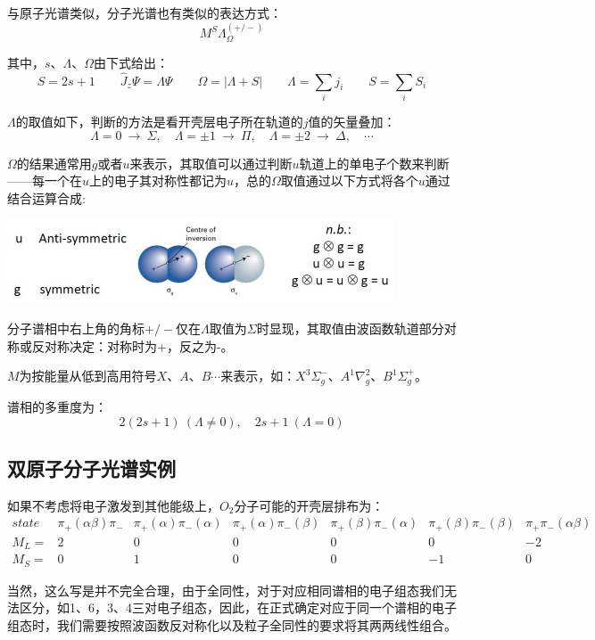 与原子光谱类似，分子光谱也有类似的表达方式：
\[M^S\Lambda^{(+/-)}_\Omega\]

其中，$s$、$\Lambda$、$\Omega$由下式给出：
\[S=2s+1 \qquad \hat{J}_z\varPsi=\Lambda\varPsi \qquad \Omega=|\Lambda+S| \qquad \Lambda=\sum_ij_i \qquad S=\sum_iS_i\]

$\Lambda$的取值如下，判断的方法是看开壳层电子所在轨道的$j$值的矢量叠加：
\[\Lambda=0 \ \rightarrow \ \Sigma, \quad \Lambda=\pm 1 \ \rightarrow \ \Pi, \quad \Lambda=\pm 2 \ \rightarrow \ \Delta, \quad \cdots\]

$\Omega$的结果通常用$g$或者$u$来表示，其取值可以通过判断$u$轨道上的单电子个数来判断——每一个在$u$上的电子其对称性都记为$u$，总的$\Omega$取值通过以下方式将各个$u$通过结合运算合成:
\begin{center}
    \includegraphics{fig/lzhx/微信图片_20211106011930.png}
\end{center}

分子谱相中右上角的角标$+/-$仅在$\Lambda$取值为$\Sigma$时显现，其取值由波函数轨道部分对称或反对称决定：对称时为+，反之为-。

$M$为按能量从低到高用符号$X$、$A$、$B$$\cdots$来表示，如：$X^3\Sigma^-_g$、$A^1\nabla^2_g$、$B^1\Sigma^+_g$。

谱相的多重度为：
\[2(2s+1) \ (\Lambda \neq 0), \quad 2s+1 \ (\Lambda = 0)\]

\subsection{双原子分子光谱实例}
如果不考虑将电子激发到其他能级上，$O_2$分子可能的开壳层排布为：
\[
    \begin{array}{lcccccc}
        state & \pi_+(\alpha\beta)\pi_- & \pi_+(\alpha)\pi_-(\alpha) & \pi_+(\alpha)\pi_-(\beta) & \pi_+(\beta)\pi_-(\alpha) & \pi_+(\beta)\pi_-(\beta) & \pi_+\pi_-(\alpha\beta) \\
        M_L=  & 2 & 0 & 0 & 0 & 0 & -2 \\
        M_S=  & 0 & 1 & 0 & 0 & -1 & 0
    \end{array}
\]

当然，这么写是并不完全合理，由于全同性，对于对应相同谱相的电子组态我们无法区分，如1、6，3、4三对电子组态，因此，在正式确定对应于同一个谱相的电子组态时，我们需要按照波函数反对称化以及粒子全同性的要求将其两两线性组合。

